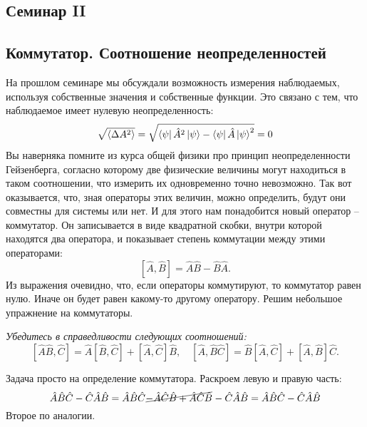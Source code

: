 \begin{center}
    \section{Семинар II}
\end{center}
\subsection{Коммутатор. Соотношение неопределенностей}
\hspace{1em} На прошлом семинаре мы обсуждали возможность измерения наблюдаемых, используя собственные значения и собственные функции. Это связано с тем, что наблюдаемое имеет нулевую неопределенность: 
\[
\sqrt{\langle\Delta A^2 \rangle} = \sqrt{\bra{\psi}\hat{A}^2\ket{\psi} - \bra{\psi}\hat{A}\ket{\psi}^2} = 0
\]
Вы наверняка помните из курса общей физики про принцип неопределенности Гейзенберга, согласно которому две физические величины могут находиться в таком соотношении, что измерить их одновременно точно невозможно. Так вот оказывается, что, зная операторы этих величин, можно определить, будут они совместны для системы или нет. И для этого нам понадобится новый оператор -- коммутатор. Он записывается в виде квадратной скобки, внутри которой находятся два оператора, и показывает степень коммутации между этими операторами:
\[
[\hat{A}, \hat{B}] = \hat{A}\hat{B} - \hat{B}\hat{A}.
\]
Из выражения очевидно, что, если операторы коммутируют, то коммутатор равен нулю. Иначе он будет равен какому-то другому оператору. Решим небольшое упражнение на коммутаторы.
\begin{center}
\textit{Убедитесь в справедливости следующих соотношений:}
\[
[\hat A \hat B, \hat C] = \hat A [\hat B, \hat C] + [\hat A, \hat C]\hat B, \quad [\hat A, \hat B \hat C] = \hat B [\hat A, \hat C] + [\hat A, \hat B] \hat C.
\]
\end{center}

Задача просто на определение коммутатора. Раскроем левую и правую часть:
\[
\hat A \hat B \hat C - \hat C \hat A \hat B = \hat A \hat B \hat C \hcancel{$- \hat A \hat C \hat B + \hat A \hat C \hat B$} - \hat C \hat A \hat B = \hat A \hat B \hat C - \hat C \hat A \hat B
\]
Второе по аналогии.

